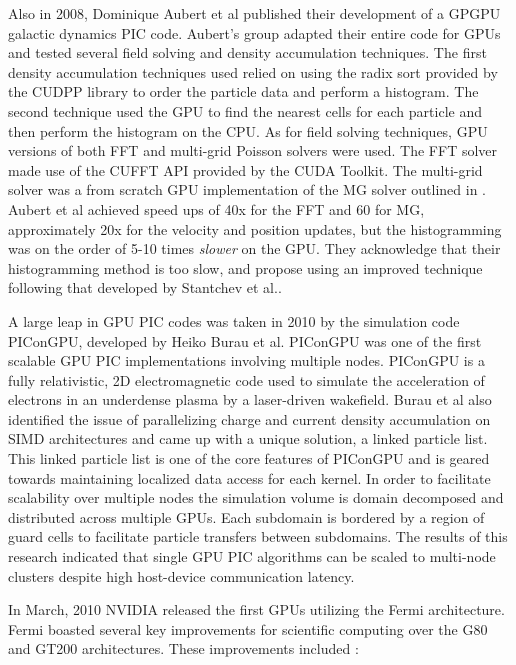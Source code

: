 Also in 2008, Dominique Aubert et al published their development of a GPGPU galactic dynamics PIC code. Aubert's group adapted their entire code for GPUs and tested several field solving and density accumulation techniques. The first density accumulation techniques used relied on using the radix sort provided by the CUDPP library to order the particle data and perform a histogram. The second technique used the GPU to find the nearest cells for each particle and then perform the histogram on the CPU. As for field solving techniques, GPU versions of both FFT and multi-grid Poisson solvers were used. The FFT solver made use of the CUFFT API provided by the CUDA Toolkit. The multi-grid solver was a from scratch GPU implementation of the MG solver outlined in \cite{NumericalRecipes}. Aubert et al achieved speed ups of 40x for the FFT and 60 for MG, approximately 20x for the velocity and position updates, but the histogramming was on the order of 5-10 times \emph{slower} on the GPU. They acknowledge that their histogramming method is too slow, and propose using an improved technique following that developed by Stantchev et al.\cite{Aubert2009}.

A large leap in GPU PIC codes was taken in 2010 by the simulation code PIConGPU, developed by Heiko Burau et al. PIConGPU was one of the first scalable GPU PIC implementations involving multiple nodes. PIConGPU is a fully relativistic, 2D electromagnetic code used to simulate the acceleration of electrons in an underdense plasma by a laser-driven wakefield. Burau et al also identified the issue of parallelizing charge and current density accumulation on SIMD architectures and came up with a unique solution, a linked particle list. This linked particle list is one of the core features of PIConGPU and is geared towards maintaining localized data access for each kernel. In order to facilitate scalability over multiple nodes the simulation volume is domain decomposed and distributed across multiple GPUs. Each subdomain is bordered by a region of guard cells to facilitate particle transfers between subdomains. The results of this research indicated that single GPU PIC algorithms can be scaled to multi-node clusters despite high host-device communication latency.\cite{Burau2010}

In March, 2010 NVIDIA released the first GPUs utilizing the Fermi architecture. Fermi boasted several key improvements for scientific computing over the G80 and GT200 architectures. These improvements included \cite{NVIDIACorporation2009}:

